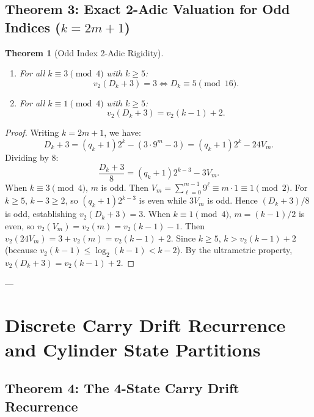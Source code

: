 \documentclass[11pt,reqno]{amsart}
\newtheorem{theorem}{Theorem}[section]
\theoremstyle{definition}
\numberwithin{equation}{section}
\begin{document}
\subsection{\texorpdfstring{Theorem 3: Exact 2-Adic Valuation for Odd Indices ($k = 2m+1$)}{Theorem 3: Exact 2-Adic Valuation for Odd Indices (k = 2m+1)}}

\begin{theorem}[Odd Index 2-Adic Rigidity]\label{thm:odd_lte}
\hfill
\begin{enumerate}
    \item For all $k \equiv 3 \pmod 4$ with $k \ge 5$:
    \begin{equation}
    v_2(D_k + 3) = 3 \iff D_k \equiv 5 \pmod{16}.
    \end{equation}
    \item For all $k \equiv 1 \pmod 4$ with $k \ge 5$:
    \begin{equation}
    v_2(D_k + 3) = v_2(k - 1) + 2.
    \end{equation}
\end{enumerate}
\end{theorem}

\begin{proof}
Writing $k = 2m + 1$, we have:
\[
D_k + 3 = (q_k + 1)2^k - (3 \cdot 9^m - 3) = (q_k + 1)2^k - 24 V_m.
\]
Dividing by $8$:
\[
\frac{D_k + 3}{8} = (q_k + 1)2^{k-3} - 3 V_m.
\]
When $k \equiv 3 \pmod 4$, $m$ is odd. Then $V_m = \sum_{\ell=0}^{m-1} 9^\ell \equiv m \cdot 1 \equiv 1 \pmod 2$.
For $k \ge 5$, $k - 3 \ge 2$, so $(q_k + 1)2^{k-3}$ is even while $3 V_m$ is odd.
Hence $(D_k + 3)/8$ is odd, establishing $v_2(D_k + 3) = 3$.
When $k \equiv 1 \pmod 4$, $m = (k-1)/2$ is even, so $v_2(V_m) = v_2(m) = v_2(k-1) - 1$.
Then $v_2(24 V_m) = 3 + v_2(m) = v_2(k-1) + 2$. Since $k \ge 5$, $k > v_2(k-1) + 2$ (because $v_2(k-1) \le \log_2(k-1) < k - 2$). By the ultrametric property, $v_2(D_k + 3) = v_2(k-1) + 2$.
\end{proof}

---

\section{Discrete Carry Drift Recurrence and Cylinder State Partitions}

\subsection{Theorem 4: The 4-State Carry Drift Recurrence}
\end{document}
